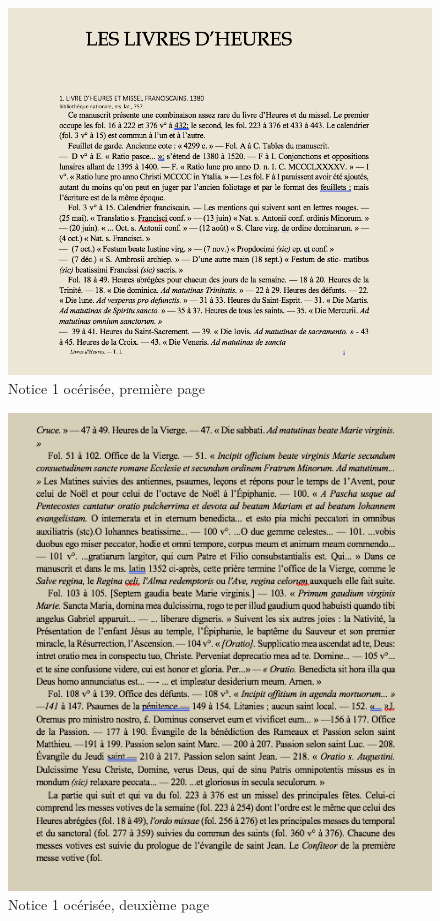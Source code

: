 \documentclass[a4paper,12pt,twoside]{book}
\begin{document}
	\begin{figure}[!h]
    \centering
    \includegraphics[width=15cm]{img/Notices_Leroquais/Notice1/OCR/Notice_OCR_1_1.png}
    \caption{Notice 1 océrisée, première page}
    \end{figure}
    \clearpage
    
    \begin{figure}[!h]
    \centering
    \includegraphics[width=15cm]{img/Notices_Leroquais/Notice1/OCR/notice_OCR_1_2.png}
    \caption{Notice 1 océrisée, deuxième page}
    \end{figure}
    \clearpage
    
\end{document}
